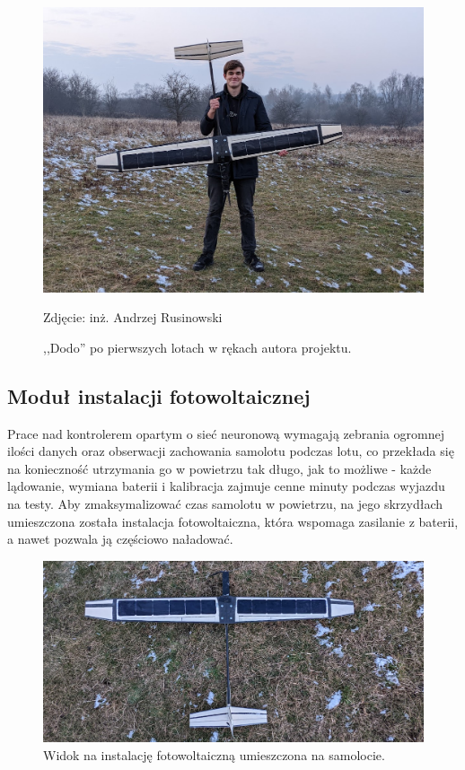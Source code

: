 \documentclass[12pt, a4paper]{article}
\begin{document}
\begin{figure}[ht]
    \centering
    \includegraphics[width=1\textwidth]{budowa16}
    \caption{,,Dodo'' po pierwszych lotach w rękach autora projektu.}
    \small Zdjęcie: inż. Andrzej Rusinowski
    \label{fig:lataxd}
\end{figure}

 \FloatBarrier
\subsection{Moduł instalacji fotowoltaicznej}
Prace nad kontrolerem opartym o sieć neuronową wymagają zebrania ogromnej ilości danych oraz obserwacji zachowania samolotu podczas lotu, co przekłada się na konieczność utrzymania go w powietrzu tak długo, jak to możliwe - każde lądowanie, wymiana baterii i kalibracja zajmuje cenne minuty podczas wyjazdu na testy. Aby zmaksymalizować czas samolotu w powietrzu, na jego skrzydłach umieszczona została instalacja fotowoltaiczna, która wspomaga zasilanie z baterii, a nawet pozwala ją częściowo naładować.

\begin{figure}[ht]
    \centering
    \includegraphics[width=1\textwidth]{panelki}
    \caption{Widok na instalację fotowoltaiczną umieszczona na samolocie.}
    \label{fig:panelki}
\end{figure}
\end{document}
